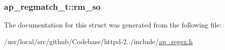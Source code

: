 \subsubsection[{\texorpdfstring{rm\+\_\+so}{rm_so}}]{ ap\+\_\+regmatch\+\_\+t\+::rm\+\_\+so}\hypertarget{structap__regmatch__t_a703711f7db759120836dbfbf1e795e7f}{}\label{structap__regmatch__t_a703711f7db759120836dbfbf1e795e7f}


The documentation for this struct was generated from the following file\+:\begin{DoxyCompactItemize}
\item 
/usr/local/src/github/\+Codebase/httpd-\/2../include/\hyperlink{ap__regex_8h}{ap\+\_\+regex.\+h}\end{DoxyCompactItemize}
